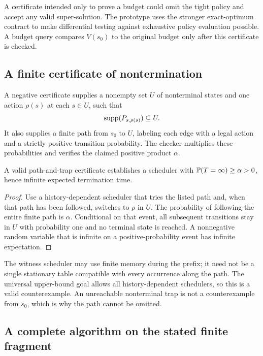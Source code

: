 A certificate intended only to prove a budget could omit the tight policy and
accept any valid super-solution. The prototype uses the stronger exact-optimum
contract to make differential testing against exhaustive policy evaluation
possible. A budget query compares $V(s_0)$ to the original budget only after
this certificate is checked.

\subsection{A finite certificate of nontermination}

A negative certificate supplies a nonempty set $U$ of nonterminal states and
one action $\rho(s)$ at each $s\in U$, such that
\begin{equation}
 \operatorname{supp}(P_{s,\rho(s)})\subseteq U.
 \label{eq:trap}
\end{equation}
It also supplies a finite path from $s_0$ to $U$, labeling each edge with a
legal action and a strictly positive transition probability. The checker
multiplies these probabilities and verifies the claimed positive product
$\alpha$.

\begin{proposition}
\label{prop:trap}
A valid path-and-trap certificate establishes a scheduler with
$\mathbb{P}(T=\infty)\ge\alpha>0$, hence infinite expected termination time.
\end{proposition}
\begin{proof}
Use a history-dependent scheduler that tries the listed path and, when that
path has been followed, switches to $\rho$ in $U$. The probability of following
the entire finite path is $\alpha$. Conditional on that event, all subsequent
transitions stay in $U$ with probability one and no terminal state is reached.
A nonnegative random variable that is infinite on a positive-probability event
has infinite expectation.
\end{proof}

The witness scheduler may use finite memory during the prefix; it need not be
a single stationary table compatible with every occurrence along the path.
The universal upper-bound goal allows all history-dependent schedulers, so
this is a valid counterexample. An unreachable nonterminal trap is not a
counterexample from $s_0$, which is why the path cannot be omitted.

\subsection{A complete algorithm on the stated finite fragment}

